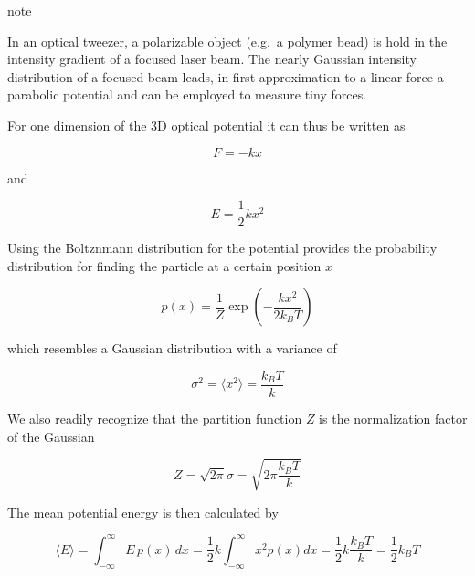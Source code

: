 \documentclass[letterpaper,10pt,english]{sphinxmanual}
\let\sphinxpxdimen\pdfpxdimen\else\newdimen\sphinxpxdimen
\begin{document}
\begin{sphinxadmonition}{note}{}\unskip
\sphinxAtStartPar
{}

\sphinxAtStartPar
In an optical tweezer, a polarizable object (e.g. a polymer bead) is hold in the intensity gradient of a focused laser beam. The nearly Gaussian intensity distribution of a focused beam leads, in first approximation to a linear force a parabolic potential and can be employed to measure tiny forces.

\noindent\sphinxincludegraphics[width=800\sphinxpxdimen,height=353\sphinxpxdimen]{{tweezers}.png}

\sphinxAtStartPar
For one dimension of the 3D optical potential it can thus be written as

\sphinxAtStartPar
\begin{equation}
F=-k x
\end{equation}

\sphinxAtStartPar
and

\sphinxAtStartPar
\begin{equation}
E=\frac{1}{2}k x^2
\end{equation}

\sphinxAtStartPar
Using the Boltznmann distribution for the potential provides the probability distribution for finding the particle at a certain position \(x\)

\sphinxAtStartPar
\begin{equation}
p(x)=\frac{1}{Z}\exp\left(-\frac{kx^2}{2k_B T} \right)
\end{equation}

\sphinxAtStartPar
which resembles a Gaussian distribution with a variance of

\sphinxAtStartPar
\begin{equation}
\sigma^2=\langle x^2 \rangle =\frac{k_B T}{k}
\end{equation}

\sphinxAtStartPar
We also readily recognize that the partition function \(Z\) is the normalization factor of the Gaussian

\sphinxAtStartPar
\begin{equation}
Z=\sqrt{2\pi }\sigma=\sqrt{2\pi\frac{k_B T }{k}}
\end{equation}

\sphinxAtStartPar
The mean potential energy is then calculated by

\sphinxAtStartPar
\begin{equation}
\langle E \rangle =\int_{-\infty}^{\infty} E\, p(x)\,dx=\frac{1}{2}k\int_{-\infty}^{\infty} x^2 p(x)dx=\frac{1}{2}k \frac{k_B T}{k}=\frac{1}{2}k_B T
\end{equation}


\end{sphinxadmonition}
\end{document}
